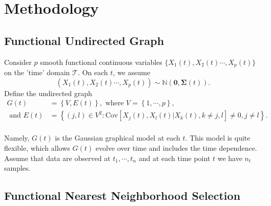 \documentclass[11pt]{article}
\newcommand{\N}{\mathbb N}
\newcommand{\bSigma}{{\boldsymbol{\Sigma}}}
\begin{document}
\section{Methodology}

\subsection{Functional Undirected Graph}
Consider $p$ smooth functional continuous variables $\{ X_1(t), X_2(t) \cdots, X_p(t)\}$ on the 'time' domain $\mathcal{T}$. On each $t$, we assume
$$ (X_1(t), X_2(t) \cdots, X_p(t)) \sim \N(\mathbf{0}, \bSigma(t)). $$ 
Define the undirected graph 
\begin{equation}
	\label{eq:funcgraph}
	\begin{aligned}
	G(t) &= \left\{ V, E(t) \right\},\text{ where } V = \left\{1,\cdots, p\right\},\\
	\text{ and } E(t) &= \left\{ (j,l) \in V^2 : \text{Cov} \left[ X_j(t), X_l(t)| X_k(t), k \neq j,l \right] \neq 0, j \neq l \right\}.\\
	\end{aligned}
\end{equation}

Namely, $G(t)$ is the Gaussian graphical model at each $t$. This model is quite flexible, which allows $G(t)$ evolve over time and includes the time dependence. Assume that data are observed at $t_1, \cdots, t_n$ and at each time point $t$ we have $n_{t}$ samples.

\subsection{Functional Nearest Neighborhood Selection}
\end{document}
